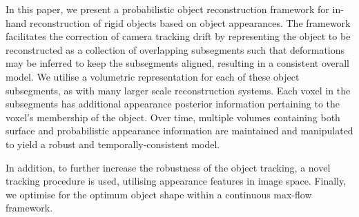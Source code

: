 In this paper, we present a probabilistic object reconstruction framework for in-hand reconstruction of rigid objects based on object
appearances. The framework facilitates the correction of camera tracking drift by representing the object to be reconstructed as a
collection of overlapping subsegments such that deformations may be inferred to keep the subsegments aligned, resulting in a consistent
overall model. We utilise a volumetric representation for each of these object subsegments, as with many larger scale reconstruction
systems.  Each voxel in the subsegments has additional appearance posterior information pertaining to the voxel's membership of the object.
Over time, multiple volumes containing both surface and probabilistic appearance information are maintained and manipulated to yield a
robust and temporally-consistent model.

In addition, to further increase the robustness of the object tracking, a novel tracking procedure is used, utilising appearance features
in image space. Finally, we optimise for the optimum object shape within a continuous max-flow framework.

